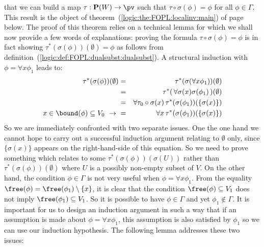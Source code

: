 that we can build a map $\tau:{\bf P}(W)\to\pv$ such that
$\tau\circ\sigma(\phi)=\phi$ for all $\phi\in\Gamma$. This result is
the object of theorem~(\ref{logic:the:FOPL:localinv:main}) of
page~\pageref{logic:the:FOPL:localinv:main} below. The proof of this
theorem relies on a technical lemma for which we shall now provide a
few words of explanations: proving the formula
$\tau\circ\sigma(\phi)=\phi$ is in fact showing
$\tau^{*}(\sigma(\phi))(\emptyset)=\phi$ as follows from
definition~(\ref{logic:def:FOPL:dualsubst:dualsubst}). A structural
induction with $\phi=\forall x\phi_{1}$ leads to:
    \begin{eqnarray*}\tau^{*}(\sigma(\phi))(\emptyset)
        &=&\tau^{*}(\sigma(\forall x\phi_{1}))(\emptyset)\\
        &=&\tau^{*}(\,\forall \sigma(x)\sigma(\phi_{1})\,)(\emptyset)\\
        &=&\forall \tau_{0}\circ\sigma(x)\,
           \tau^{*}(\sigma(\phi_{1}))(\{\sigma(x)\})\\
        x\in\bound(\phi)\subseteq V_{0}\ \to\ 
        &=&\forall x\,\tau^{*}(\sigma(\phi_{1}))(\{\sigma(x)\})
    \end{eqnarray*}
So we are immediately confronted with two separate issues. One the
one hand we cannot hope to carry out a successful induction argument
relating to $\emptyset$ only, since $\{\sigma(x)\}$ appears on the
right-hand-side of this equation. So we need to prove something
which relates to some $\tau^{*}(\sigma(\phi))(\sigma(U))$
rather than $\tau^{*}(\sigma(\phi))(\emptyset)$ where $U$ is a 
possibly non-empty subset of $V$. On the other hand, the condition
$\phi\in\Gamma$ is not very useful when $\phi=\forall x\phi_{1}$.
From the equality $\free(\phi)=\free(\phi_{1})\setminus\{x\}$, it is
clear that the condition $\free(\phi)\subseteq V_{1}$ does not imply
$\free(\phi_{1})\subseteq V_{1}$. So it is possible to have
$\phi\in\Gamma$ and yet $\phi_{1}\not\in\Gamma$. It is important for
us to design an induction argument in such a way that if an
assumption is made about $\phi=\forall x\phi_{1}$, this assumption
is also satisfied by $\phi_{1}$ so we can use our induction
hypothesis. The following lemma addresses these two issues:


